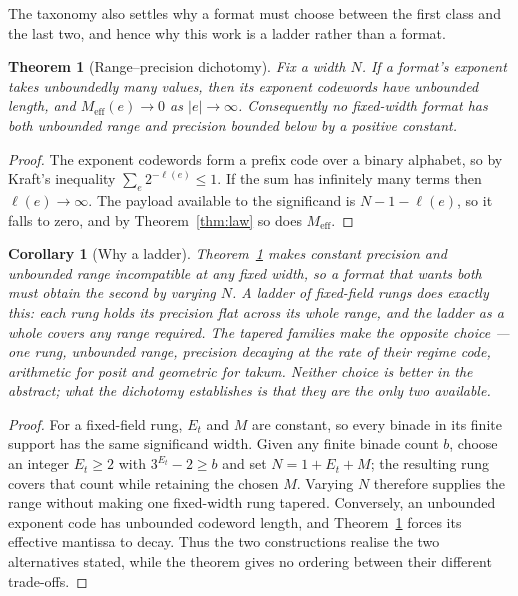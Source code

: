 \documentclass[11pt]{article}
\newtheorem{theorem}{Theorem}
\newtheorem{corollary}{Corollary}
\theoremstyle{definition}
\begin{document}
The taxonomy also settles why a format must choose between the first class and the
last two, and hence why this work is a ladder rather than a format.

\begin{theorem}[Range--precision dichotomy]
\label{thm:dichotomy}
Fix a width $N$. If a format's exponent takes unboundedly many values, then its
exponent codewords have unbounded length, and
$M_{\mathrm{eff}}(e)\to0$ as $|e|\to\infty$. Consequently no fixed-width format
has both unbounded range and precision bounded below by a positive constant.
\end{theorem}

\begin{proof}
The exponent codewords form a prefix code over a binary alphabet, so by Kraft's
inequality $\sum_{e} 2^{-\ell(e)} \leq 1$. If the sum has infinitely many terms
then $\ell(e) \to \infty$. The payload available to the significand is
$N - 1 - \ell(e)$, so it falls to zero, and by Theorem~\ref{thm:law} so does
$M_{\mathrm{eff}}$.
\end{proof}

\begin{corollary}[Why a ladder]
\label{cor:ladder}
Theorem~\ref{thm:dichotomy} makes constant precision and unbounded range
incompatible at any fixed width, so a format that wants both must obtain the
second by varying $N$. A ladder of fixed-field rungs does exactly this: each rung
holds its precision flat across its whole range, and the ladder as a whole covers
any range required. The tapered families make the opposite choice --- one rung,
unbounded range, precision decaying at the rate of their regime code, arithmetic
for posit and geometric for takum. Neither choice is better in the abstract; what
the dichotomy establishes is that they are the only two available.
\end{corollary}
\begin{proof}
For a fixed-field rung, $E_t$ and $M$ are constant, so every binade in its
finite support has the same significand width. Given any finite binade count
$b$, choose an integer $E_t\ge2$ with $3^{E_t}-2\ge b$ and set
$N=1+E_t+M$; the resulting rung covers that count while retaining the chosen
$M$. Varying $N$ therefore supplies the range without making one fixed-width
rung tapered. Conversely, an unbounded exponent code has unbounded codeword
length, and Theorem~\ref{thm:dichotomy} forces its effective mantissa to decay.
Thus the two constructions realise the two alternatives stated, while the
theorem gives no ordering between their different trade-offs.
\end{proof}
\end{document}
